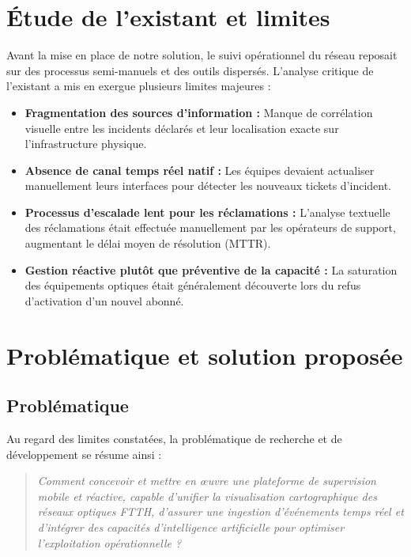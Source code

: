 \section{\'Etude de l'existant et limites}
Avant la mise en place de notre solution, le suivi op\'erationnel du r\'eseau reposait sur des processus semi-manuels et des outils dispers\'es. L'analyse critique de l'existant a mis en exergue plusieurs limites majeures :
\begin{itemize}
    \item \textbf{Fragmentation des sources d'information :} Manque de corr\'elation visuelle entre les incidents d\'eclar\'es et leur localisation exacte sur l'infrastructure physique.
    \item \textbf{Absence de canal temps r\'eel natif :} Les \'equipes devaient actualiser manuellement leurs interfaces pour d\'etecter les nouveaux tickets d'incident.
    \item \textbf{Processus d'escalade lent pour les r\'eclamations :} L'analyse textuelle des r\'eclamations \'etait effectu\'ee manuellement par les op\'erateurs de support, augmentant le d\'elai moyen de r\'esolution (MTTR).
    \item \textbf{Gestion r\'eactive plut\^ot que pr\'eventive de la capacit\'e :} La saturation des \'equipements optiques \'etait g\'en\'eralement d\'ecouverte lors du refus d'activation d'un nouvel abonn\'e.
\end{itemize}

\section{Probl\'ematique et solution propos\'ee}

\subsection{Probl\'ematique}
Au regard des limites constat\'ees, la probl\'ematique de recherche et de d\'eveloppement se r\'esume ainsi :
\begin{quote}
\textit{\og Comment concevoir et mettre en \oe uvre une plateforme de supervision mobile et r\'eactive, capable d'unifier la visualisation cartographique des r\'eseaux optiques FTTH, d'assurer une ingestion d'\'ev\'enements temps r\'eel et d'int\'egrer des capacit\'es d'intelligence artificielle pour optimiser l'exploitation op\'erationnelle ? \fg}
\end{quote}


